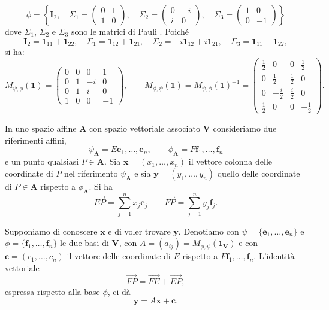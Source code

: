 \documentclass{article}
\theoremstyle{plain}
\theoremstyle{definition}
\theoremstyle{remark}
\begin{document}
\[
\phi = \left\{ 
\mathbf{I}_2, \quad 
\Sigma_1 = \begin{pmatrix} 0 & 1 \\ 1 & 0 \end{pmatrix}, \quad 
\Sigma_2 = \begin{pmatrix} 0 & -i \\ i & 0 \end{pmatrix}, \quad 
\Sigma_3 = \begin{pmatrix} 1 & 0 \\ 0 & -1 \end{pmatrix} 
\right\}
\]
dove $\Sigma_1$, $\Sigma_2$ e $\Sigma_3$ sono le matrici di Pauli . Poiché
\[
\mathbf{I}_2 = \mathbf{1}_{11} + \mathbf{1}_{22}, \quad \Sigma_1 = \mathbf{1}_{12} + \mathbf{1}_{21}, \quad \Sigma_2 = -i \mathbf{1}_{12} + i \mathbf{1}_{21}, \quad \Sigma_3 = \mathbf{1}_{11} - \mathbf{1}_{22},
\]
si ha:
\[
M_{\psi,\phi}(\mathbf{1}) = 
\begin{pmatrix}
0 & 0 & 0 & 1 \\
0 & 1 & -i & 0 \\
0 & 1 & i & 0 \\
1 & 0 & 0 & -1
\end{pmatrix},\quad\quad M_{\phi,\psi}(\mathbf{1}) = M_{\psi,\phi}(\mathbf{1})^{-1} = 
\begin{pmatrix}
\frac{1}{2} & 0 & 0 & \frac{1}{2} \\
0 & \frac{1}{2} & \frac{1}{2} & 0 \\
0 & -\frac{i}{2} & \frac{i}{2} & 0 \\
\frac{1}{2} & 0 & 0 & -\frac{1}{2}
\end{pmatrix}.
\]

\vspace{10pt}

In uno spazio affine $\mathbf{A}$ con spazio vettoriale associato $\mathbf{V}$ consideriamo due riferimenti affini, 
\[\psi_\mathbf{A}=E \mathbf{e}_1, \dots, \mathbf{e}_n,\quad\quad \phi_\mathbf{A}=F \mathbf{f}_1, \dots, \mathbf{f}_n\]
e un punto qualsiasi $P \in \mathbf{A}$. 
Sia $\mathbf{x} = (x_1, \dots, x_n)$ il vettore colonna delle coordinate di $P$ nel riferimento $\psi_\mathbf{A}$ e sia $\mathbf{y} = (y_1, \dots, y_n)$ quello delle coordinate di $P \in \mathbf{A}$ rispetto a $\phi_\mathbf{A}$.
Si ha
\[
\overrightarrow{EP} = \sum_{j=1}^{n}x_j \mathbf{e}_j \quad\quad \overrightarrow{FP} = \sum_{j=1}^{n}y_j \mathbf{f}_j. 
\]

Supponiamo di conoscere $\mathbf{x}$ e di voler trovare $\mathbf{y}$.
Denotiamo con $\psi = \{\mathbf{e}_1, \dots, \mathbf{e}_n\}$ e $\phi = \{\mathbf{f}_1, \dots, \mathbf{f}_n\}$ le due basi di $\mathbf{V}$, con 
$A = (a_{ij}) = M_{\phi,\psi}(\mathbf{1_V})$ e con $\mathbf{c} = (c_1, \dots, c_n)$ il vettore delle coordinate di $E$ rispetto a $F \mathbf{f}_1, \dots, \mathbf{f}_n$. 
L'identità vettoriale
\[
\overrightarrow{FP} = \overrightarrow{FE} + \overrightarrow{EP},
\]
espressa rispetto alla base $\phi$, ci dà
\begin{equation}\label{dodicii}
\mathbf{y} = A\mathbf{x} + \mathbf{c}.    
\end{equation}
\end{document}
